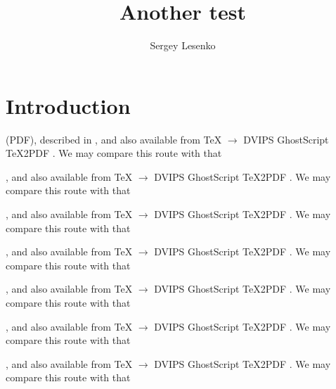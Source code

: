 \documentclass{article}
\begin{document}
\title{Another test}
\author{Sergey Lesenko}
\maketitle

\section{Introduction}
(PDF), described in
\cite{Adobe,Deutsch}, and also available from
\TeX{} $\longrightarrow$ DVIPS\cite{Rokicki} 
GhostScript\cite{Deutsch}
TeX2PDF\cite{Sojka}
\cite{Haralambous:TB16-2-162}.  We may compare this route with that

\citeyear{Adobe}, and also available from
\TeX{} $\longrightarrow$ DVIPS\citeyear{Rokicki} 
GhostScript\citeyear{Deutsch}
TeX2PDF\citeyear{Sojka}
\citeyear{Haralambous:TB16-2-162}.  We may compare this route with that

\citeauthor{Adobe}, and also available from
\TeX{} $\longrightarrow$ DVIPS\citeauthor{Rokicki} 
GhostScript\citeauthor{Deutsch}
TeX2PDF\citeauthor{Sojka}
\citeauthor{Haralambous:TB16-2-162}.  We may compare this route with that

, and also available from
\TeX{} $\longrightarrow$ DVIPS 
GhostScript
TeX2PDF
.  We may compare this route with that

\citet{Adobe}, and also available from
\TeX{} $\longrightarrow$ DVIPS\citet{Rokicki} 
GhostScript\citet{Deutsch}
TeX2PDF\citet{Sojka}
\citet{Haralambous:TB16-2-162}.  We may compare this route with that

\citealt{Adobe}, and also available from
\TeX{} $\longrightarrow$ DVIPS\citealt{Rokicki} 
GhostScript\citealt{Deutsch}
TeX2PDF\citealt{Sojka}
\citealt{Haralambous:TB16-2-162}.  We may compare this route with that

\cite*{Adobe}, and also available from
\TeX{} $\longrightarrow$ DVIPS\cite*{Rokicki} 
GhostScript\cite*{Deutsch}
TeX2PDF\cite*{Sojka}
\cite*{Haralambous:TB16-2-162}.  We may compare this route with that


\end{document}
